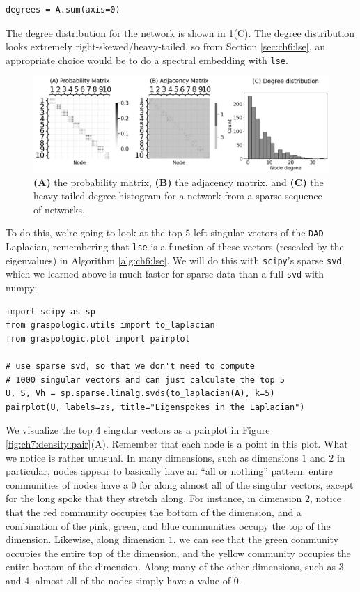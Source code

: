 \begin{lstlisting}[style=python]
degrees = A.sum(axis=0)
\end{lstlisting}

The degree distribution for the network is shown in \ref{fig:ch7:density:deg}(C). The degree distribution looks extremely right-skewed/heavy-tailed, so from Section \ref{sec:ch6:lse}, an appropriate choice would be to do a spectral embedding with \texttt{lse}.

\begin{figure}[h]
    \centering
    \includegraphics[width=\linewidth]{applications/ch7/Images/eigenspoke_ex.png}
    \caption[Network sample from sparse networks]{\textbf{(A)} the probability matrix, \textbf{(B)} the adjacency matrix, and \textbf{(C)} the heavy-tailed degree histogram for a network from a sparse sequence of networks.}
    \label{fig:ch7:density:deg}
\end{figure}

To do this, we're going to look at the top $5$ left singular vectors of the \texttt{DAD} Laplacian, remembering that \texttt{lse} is a function of these vectors (rescaled by the eigenvalues) in Algorithm \ref{alg:ch6:lse}. We will do this with \texttt{scipy}'s sparse \texttt{svd}, which we learned above is much faster for sparse data than a full \texttt{svd} with numpy:

\begin{lstlisting}[style=python]
import scipy as sp
from graspologic.utils import to_laplacian
from graspologic.plot import pairplot

# use sparse svd, so that we don't need to compute
# 1000 singular vectors and can just calculate the top 5
U, S, Vh = sp.sparse.linalg.svds(to_laplacian(A), k=5)
pairplot(U, labels=zs, title="Eigenspokes in the Laplacian")
\end{lstlisting}

We visualize the top $4$ singular vectors as a pairplot in Figure \ref{fig:ch7:density:pair}(A). Remember that each node is a point in this plot. What we notice is rather unusual. In many dimensions, such as dimensions $1$ and $2$ in particular, nodes appear to basically have an ``all or nothing'' pattern: entire communities of nodes have a $0$ for along almost all of the singular vectors, except for the long spoke that they stretch along. For instance, in dimension $2$, notice that the red community occupies the bottom of the dimension, and a combination of the pink, green, and blue communities occupy the top of the dimension. Likewise, along dimension $1$, we can see that the green community occupies the entire top of the dimension, and the yellow community occupies the entire bottom of the dimension. Along many of the other dimensions, such as $3$ and $4$, almost all of the nodes simply have a value of $0$. 

